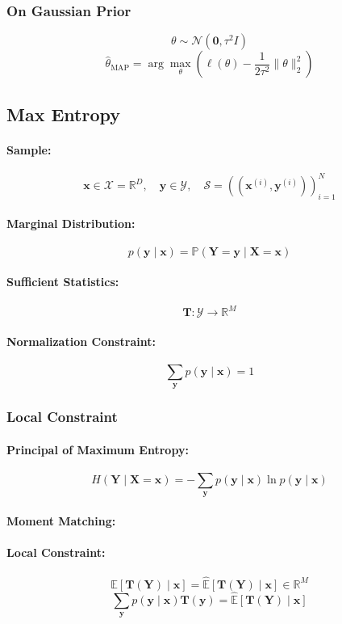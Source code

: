\documentclass{article}
\begin{document}
\subsubsection{On Gaussian Prior}
\[
    \theta \sim \mathcal{N}(\mathbf{0}, \tau^2 I)
\]
\[
    \hat{\theta}_{\text{MAP}} = \arg\max_{\theta} \left( \ell(\theta) - \frac{1}{2\tau^2} \|\theta\|_2^2 \right)
\]


\subsection{Max Entropy}

\paragraph{Sample:}
\[
    \mathbf{x} \in \mathcal{X} = \mathbb{R}^D, \quad \mathbf{y} \in \mathcal{Y}, \quad \mathcal{S} = \left( (\mathbf{x}^{(i)}, \mathbf{y}^{(i)}) \right)_{i=1}^N
\]
\paragraph{Marginal Distribution:}
\[
    p(\mathbf{y} \mid \mathbf{x}) = \mathbb{P}(\mathbf{Y}=\mathbf{y} \mid \mathbf{X}=\mathbf{x})
\]
\paragraph{Sufficient Statistics:}
\[
    \mathbf{T}: \mathcal{Y} \rightarrow \mathbb{R}^M
\]
\paragraph{Normalization Constraint:}
\[
    \sum_{\mathbf{y}} p(\mathbf{y} \mid \mathbf{x}) = 1
\]

\subsubsection{Local Constraint}

\paragraph{Principal of Maximum Entropy:}
\[
    H(\mathbf{Y} \mid \mathbf{X}=\mathbf{x}) = - \sum_{\mathbf{y}} p(\mathbf{y} \mid \mathbf{x}) \ln p(\mathbf{y} \mid \mathbf{x})
\]
\paragraph{Moment Matching:}
\paragraph{Local Constraint:}
\[
    \mathbb{E}[\mathbf{T}(\mathbf{Y}) \mid \mathbf{x}] = \hat{\mathbb{E}}[\mathbf{T}(\mathbf{Y}) \mid \mathbf{x}] \in \mathbb{R}^M
\]
\[
    \sum_{\mathbf{y}} p(\mathbf{y} \mid \mathbf{x}) \mathbf{T}(\mathbf{y}) = \hat{\mathbb{E}}[\mathbf{T}(\mathbf{Y}) \mid \mathbf{x}]
\]
\end{document}
